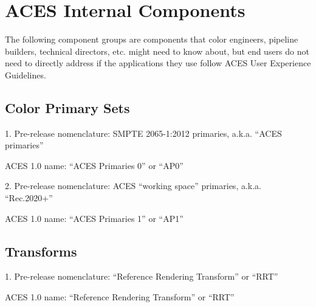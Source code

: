 \numberedformat
\chapter{ACES Internal Components}

The following component groups are components that color engineers, pipeline builders, technical directors, etc. might need to know about, but end users do not need to directly address if the applications they use follow ACES User Experience Guidelines. 

\section{Color Primary Sets}
1. Pre-release nomenclature: SMPTE 2065-1:2012 primaries, a.k.a. ``ACES primaries''

ACES 1.0 name: ``ACES Primaries 0'' or ``AP0''

\vspace{10pt}
2. Pre-release nomenclature: ACES ``working space'' primaries, a.k.a. ``Rec.2020+''

ACES 1.0 name: ``ACES Primaries 1'' or ``AP1''

\section{Transforms}
1. Pre-release nomenclature: ``Reference Rendering Transform'' or ``RRT''

ACES 1.0 name: ``Reference Rendering Transform'' or ``RRT''

